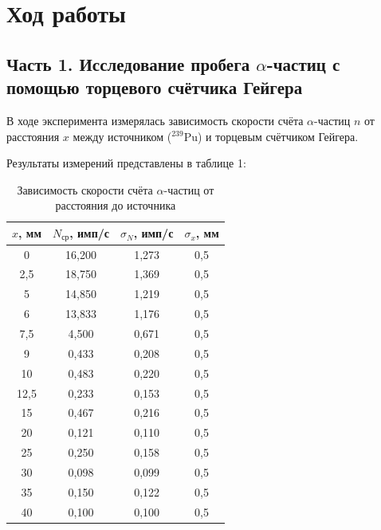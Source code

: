 \documentclass[12pt, a4paper]{article}
\begin{document}
\section*{Ход работы}

\subsection*{Часть 1. Исследование пробега $\alpha$-частиц с помощью торцевого счётчика Гейгера}

В ходе эксперимента измерялась зависимость скорости счёта $\alpha$-частиц $n$ от расстояния $x$ между источником ($^{239}$Pu) и торцевым счётчиком Гейгера.%

Результаты измерений представлены в таблице 1:%

\begin{table}[H]
\centering

\renewcommand{\arraystretch}{1.3} %
\begin{tabular}{|c|c|c|c|}
\hline
$x$, мм & $N_{\text{ср}}$, имп/с & $\sigma_N$, имп/с & $\sigma_x$, мм \\
\hline
0    & 16,200 & 1,273 & 0,5 \\
2,5  & 18,750 & 1,369 & 0,5 \\
5    & 14,850 & 1,219 & 0,5 \\
6    & 13,833 & 1,176 & 0,5 \\
7,5  & 4,500  & 0,671 & 0,5 \\
9    & 0,433  & 0,208 & 0,5 \\
10   & 0,483  & 0,220 & 0,5 \\
12,5 & 0,233  & 0,153 & 0,5 \\
15   & 0,467  & 0,216 & 0,5 \\
20   & 0,121  & 0,110 & 0,5 \\
25   & 0,250  & 0,158 & 0,5 \\
30   & 0,098  & 0,099 & 0,5 \\
35   & 0,150  & 0,122 & 0,5 \\
40   & 0,100  & 0,100 & 0,5 \\
\hline
\end{tabular}
\caption{Зависимость скорости счёта $\alpha$-частиц от расстояния до источника}
\label{tab:geiger_data}
\vspace{0.2cm}
\end{table}
\end{document}
